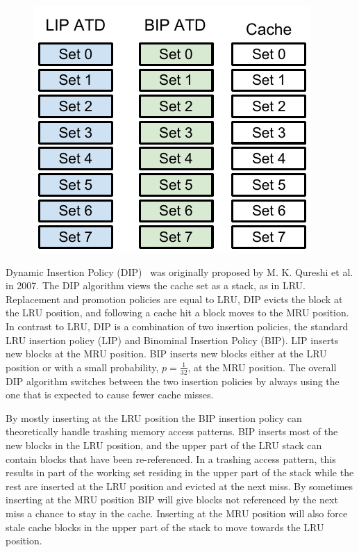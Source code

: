 \begin{figure}
    \centering
    \includegraphics[width=\textwidth]{figures/algorithms/DIP_atd_architecture}
\end{figure}

Dynamic Insertion Policy (DIP)~\cite{Qureshi2007} was originally proposed by M. K. Qureshi et al. in 2007.
The DIP algorithm views the cache set as a stack, as in LRU.
Replacement and promotion policies are equal to LRU, DIP evicts the block at the LRU position, and following a cache hit a block moves to the MRU position.
In contrast to LRU, DIP is a combination of two insertion policies, the standard LRU insertion policy (LIP) and Binominal Insertion Policy (BIP).
LIP inserts new blocks at the MRU position.
BIP inserts new blocks either at the LRU position or with a small probability, $p = \frac{1}{32}$, at the MRU position. 
The overall DIP algorithm switches between the two insertion policies by always using the one that is expected to cause fewer cache misses.

By mostly inserting at the LRU position the BIP insertion policy can theoretically handle trashing memory access patterns.
BIP inserts most of the new blocks in the LRU position, and the upper part of the LRU stack can contain blocks that have been re-referenced.
In a trashing access pattern, this results in part of the working set residing in the upper part of the stack while the rest are inserted at the LRU position and evicted at the next miss.
By sometimes inserting at the MRU position BIP will give blocks not referenced by the next miss a chance to stay in the cache. 
Inserting at the MRU position will also force stale cache blocks in the upper part of the stack to move towards the LRU position.

